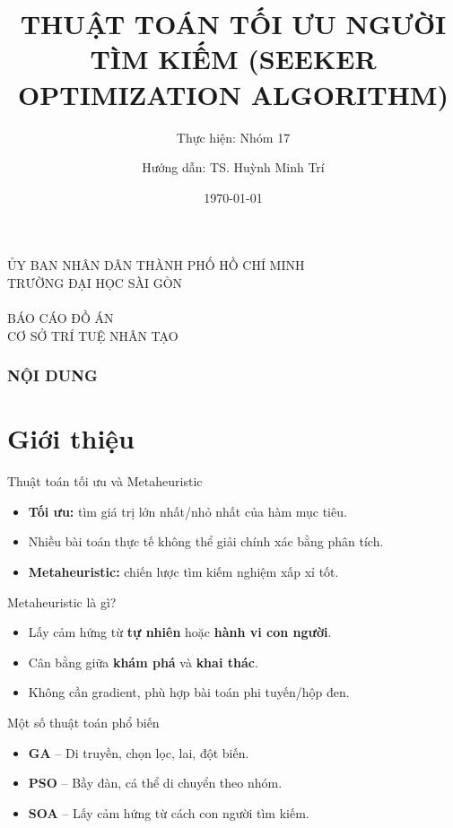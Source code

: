 \documentclass[10pt]{beamer}
\title{THUẬT TOÁN TỐI ƯU NGƯỜI TÌM KIẾM (SEEKER OPTIMIZATION ALGORITHM)}
\date{\today}
\author{Hướng dẫn: TS. Huỳnh Minh Trí}
\subtitle{Thực hiện: Nhóm 17}
\begin{document}
\begin{frame}
  \centering
  {\footnotesize
  ỦY BAN NHÂN DÂN THÀNH PHỐ HỒ CHÍ MINH\\
  TRƯỜNG ĐẠI HỌC SÀI GÒN}\\
  \phantom{space}\\
  {\normalsize BÁO CÁO ĐỒ ÁN\\
  CƠ SỞ TRÍ TUỆ NHÂN TẠO}\\[-50pt]
  \titlepage
\end{frame}

\begin{frame}
    \frametitle{NỘI DUNG}
    \tableofcontents
\end{frame}

\section{Giới thiệu}

\begin{frame}{Thuật toán tối ưu và Metaheuristic}
\begin{itemize}
    \item \textbf{Tối ưu:} tìm giá trị lớn nhất/nhỏ nhất của hàm mục tiêu.
    \item Nhiều bài toán thực tế không thể giải chính xác bằng phân tích.
    \item \textbf{Metaheuristic:} chiến lược tìm kiếm nghiệm xấp xỉ tốt.
\end{itemize}
\end{frame}

\begin{frame}{Metaheuristic là gì?}
\begin{itemize}
    \item Lấy cảm hứng từ \textbf{tự nhiên} hoặc \textbf{hành vi con người}.
    \item Cân bằng giữa \textbf{khám phá} và \textbf{khai thác}.
    \item Không cần gradient, phù hợp bài toán phi tuyến/hộp đen.
\end{itemize}
\end{frame}

\begin{frame}{Một số thuật toán phổ biến}
\begin{itemize}
    \item \textbf{GA} – Di truyền, chọn lọc, lai, đột biến.
    \item \textbf{PSO} – Bầy đàn, cá thể di chuyển theo nhóm.
    \item \textbf{SOA} – Lấy cảm hứng từ cách con người tìm kiếm.
\end{itemize}
\end{frame}
\end{document}
